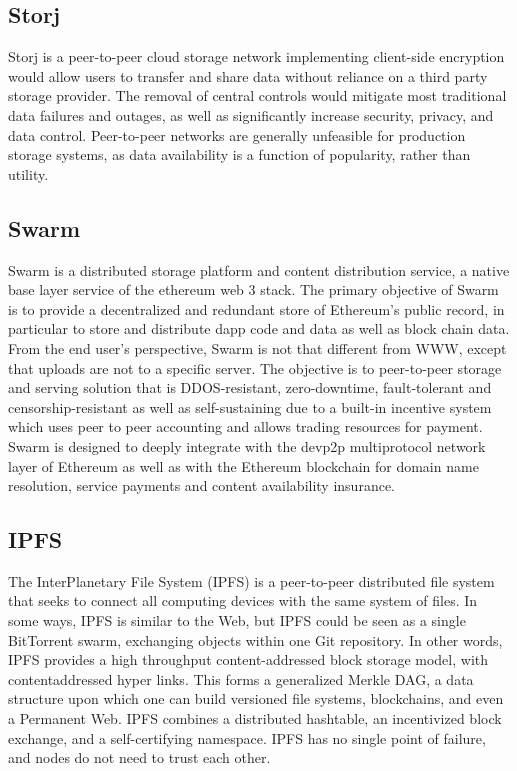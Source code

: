 \subsection*{Storj}
Storj is a peer-to-peer cloud storage network implementing client-side encryption would allow users to transfer and share data without reliance on a third party storage provider. The removal of central controls would mitigate most traditional data failures and outages, as well as significantly increase security, privacy, and data control. Peer-to-peer networks are generally unfeasible for production storage systems, as data availability is a function of popularity, rather than utility.

\subsection*{Swarm}
Swarm is a distributed storage platform and content distribution service, a native base layer service of the ethereum web 3 stack. The primary objective of Swarm is to provide a decentralized and redundant store of Ethereum's public record, in particular to store and distribute dapp code and data as well as block chain data.
From the end user's perspective, Swarm is not that different from WWW, except that uploads are not to a specific server. The objective is to peer-to-peer storage and serving solution that is DDOS-resistant, zero-downtime, fault-tolerant and censorship-resistant as well as self-sustaining due to a built-in incentive system which uses peer to peer accounting and allows trading resources for payment. Swarm is designed to deeply integrate with the devp2p multiprotocol network layer of Ethereum as well as with the Ethereum blockchain for domain name resolution, service payments and content availability insurance.

\subsection*{IPFS}
The InterPlanetary File System (IPFS) is a peer-to-peer distributed file system that seeks to connect all computing devices with the same system of files. In some ways, IPFS is similar to the Web, but IPFS could be seen as a single BitTorrent swarm, exchanging objects within one Git repository. In other words, IPFS provides a high throughput content-addressed block storage model, with contentaddressed hyper links. This forms a generalized Merkle DAG, a data structure upon which one can build versioned file systems, blockchains, and even a Permanent Web. IPFS combines a distributed hashtable, an incentivized block exchange, and a self-certifying namespace. IPFS has no single point of failure, and nodes do not need to trust each other.

